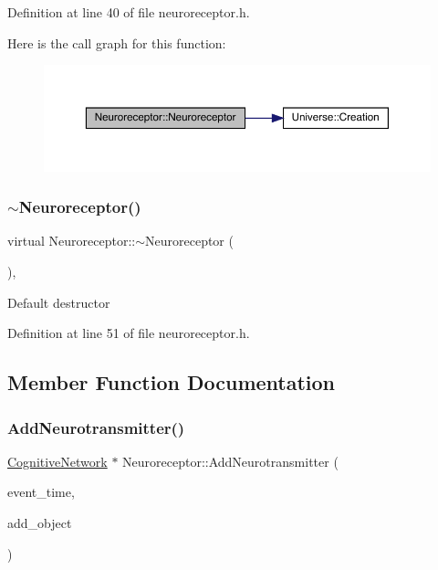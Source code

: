 Definition at line 40 of file neuroreceptor.\+h.

Here is the call graph for this function\+:
\nopagebreak
\begin{figure}[H]
\begin{center}
\leavevmode
\includegraphics[width=350pt]{class_neuroreceptor_ab002bab3b4ffeed402f60e574ce0263e_cgraph}
\end{center}
\end{figure}
\mbox{\label{class_neuroreceptor_ac9c1e9e985ed85712c14c85e306bebc9}} 
\subsubsection{\texorpdfstring{$\sim$\+Neuroreceptor()}{~Neuroreceptor()}}
{\footnotesize\ttfamily virtual Neuroreceptor\+::$\sim$\+Neuroreceptor (\begin{DoxyParamCaption}{ }\end{DoxyParamCaption})\hspace{0.3cm}{\ttfamily [inline]}, {\ttfamily [virtual]}}

Default destructor 

Definition at line 51 of file neuroreceptor.\+h.



\subsection{Member Function Documentation}
\mbox{\label{class_neuroreceptor_a900b21f6feb6334d4ff8a3fd5244bf05}} 
\subsubsection{\texorpdfstring{Add\+Neurotransmitter()}{AddNeurotransmitter()}}
{\footnotesize\ttfamily \hyperlink{class_cognitive_network}{Cognitive\+Network} $\ast$ Neuroreceptor\+::\+Add\+Neurotransmitter (\begin{DoxyParamCaption}\item[{std\+::chrono\+::time\+\_\+point$<$ \hyperlink{universe_8h_a0ef8d951d1ca5ab3cfaf7ab4c7a6fd80}{Clock} $>$}]{event\+\_\+time,  }\item[{\hyperlink{class_cognitive_network}{Cognitive\+Network} $\ast$}]{add\+\_\+object }\end{DoxyParamCaption})}



